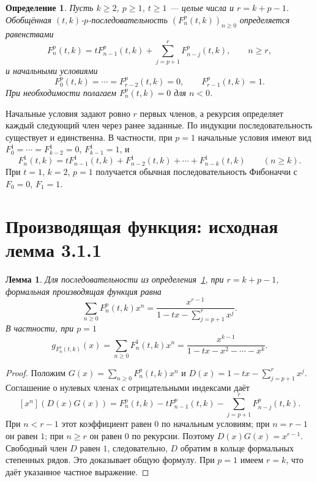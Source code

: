 \documentclass[12pt,a4paper]{article}
\newtheorem{lemma}{Лемма}[section]
\newtheorem{definition}{Определение}[section]
\begin{document}
\begin{definition}\label{defn1pil}
Пусть $k\ge2$, $p\ge1$, $t\ge1$ --- целые числа и $r=k+p-1$.
Обобщённая $(t,k)$-$p$-последовательность
$(F_n^p(t,k))_{n\ge0}$ определяется равенствами
\begin{equation}
 F_n^p(t,k)=tF_{n-1}^p(t,k)
       +\sum_{j=p+1}^{r}F_{n-j}^p(t,k),
 \qquad n\ge r,
\end{equation}
и начальными условиями
\begin{equation}
 F_0^p(t,k)=\cdots=F_{r-2}^p(t,k)=0,
 \qquad F_{r-1}^p(t,k)=1.
\end{equation}
При необходимости полагаем $F_n^p(t,k)=0$ для $n<0$.
\end{definition}

Начальные условия задают ровно $r$ первых членов, а рекурсия
определяет каждый следующий член через ранее заданные.
По индукции последовательность существует и единственна.
В частности, при $p=1$ начальные условия имеют вид
$F_0^1=\cdots=F_{k-2}^1=0$, $F_{k-1}^1=1$, и
\[
 F_n^1(t,k)=tF_{n-1}^1(t,k)+F_{n-2}^1(t,k)+\cdots+F_{n-k}^1(t,k)
 \qquad(n\ge k).
\]
При $t=1$, $k=2$, $p=1$ получается обычная последовательность
Фибоначчи с $F_0=0$, $F_1=1$.
\section{Производящая функция: исходная лемма 3.1.1}
\begin{lemma}\label{lemgenn1}
Для последовательности из определения~\ref{defn1pil}, при $r=k+p-1$,
формальная производящая функция равна
\[
 \sum_{n\ge0}F_n^p(t,k)x^n
 =\frac{x^{r-1}}{1-tx-\sum_{j=p+1}^{r}x^j}.
\]
В частности, при $p=1$
\begin{equation}
 g_{F_n^1(t,k)}(x)
 =\sum_{n\ge0}F_n^1(t,k)x^n
 =\frac{x^{k-1}}{1-tx-x^2-\cdots-x^k}.
\end{equation}
\end{lemma}
\begin{proof}
Положим $G(x)=\sum_{n\ge0}F_n^p(t,k)x^n$ и
$D(x)=1-tx-\sum_{j=p+1}^{r}x^j$.
Соглашение о нулевых членах с отрицательными индексами даёт
\[
 [x^n](D(x)G(x))
 =F_n^p(t,k)-tF_{n-1}^p(t,k)
       -\sum_{j=p+1}^{r}F_{n-j}^p(t,k).
\]
При $n<r-1$ этот коэффициент равен $0$ по начальным условиям;
при $n=r-1$ он равен $1$; при $n\ge r$ он равен $0$
по рекурсии. Поэтому $D(x)G(x)=x^{r-1}$.
Свободный член $D$ равен $1$, следовательно, $D$ обратим
в кольце формальных степенных рядов. Это доказывает общую формулу.
При $p=1$ имеем $r=k$, что даёт указанное частное выражение.
\end{proof}
\end{document}
